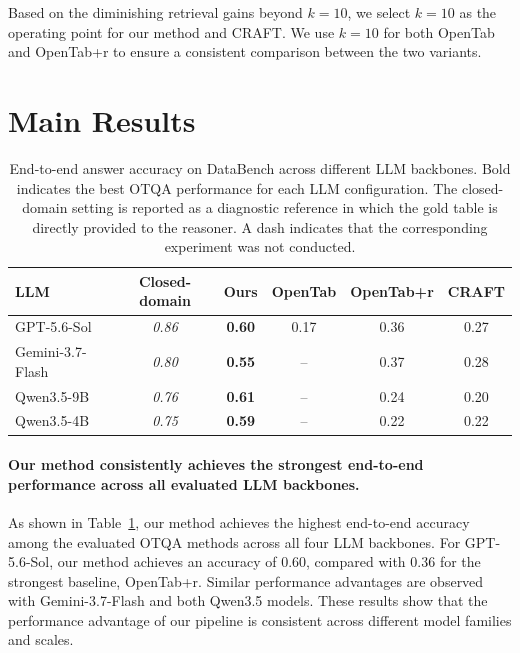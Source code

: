 Based on the diminishing retrieval gains beyond $k=10$, we select $k=10$ as the operating point for our method and CRAFT.
We use $k=10$ for both OpenTab and OpenTab+r to ensure a consistent comparison between the two variants.

\section{Main Results}
\begin{table}[t]
\centering
\caption{End-to-end answer accuracy on DataBench across different LLM backbones.
Bold indicates the best OTQA performance for each LLM configuration.
The closed-domain setting is reported as a diagnostic reference in which the gold table is directly provided to the reasoner.
A dash indicates that the corresponding experiment was not conducted.}
\label{tab:main_results}
\begin{tabular}{lccccc}
\toprule
\textbf{LLM} &
\textbf{Closed-domain} &
\textbf{Ours} &
\textbf{OpenTab} &
\textbf{OpenTab+r} &
\textbf{CRAFT} \\
\midrule
GPT-5.6-Sol
& \textit{0.86}
& \textbf{0.60}
& 0.17
& 0.36
& 0.27 \\

Gemini-3.7-Flash
& \textit{0.80}
& \textbf{0.55}
& --
& 0.37
& 0.28 \\

Qwen3.5-9B
& \textit{0.76}
& \textbf{0.61}
& --
& 0.24
& 0.20 \\

Qwen3.5-4B
& \textit{0.75}
& \textbf{0.59}
& --
& 0.22
& 0.22 \\
\bottomrule
\end{tabular}
\end{table}


\paragraph{Our method consistently achieves the strongest end-to-end performance across all evaluated LLM backbones.}
As shown in Table~\ref{tab:main_results}, our method achieves the highest end-to-end accuracy among the evaluated OTQA methods across all four LLM backbones.
For GPT-5.6-Sol, our method achieves an accuracy of $0.60$, compared with $0.36$ for the strongest baseline, OpenTab+r.
Similar performance advantages are observed with Gemini-3.7-Flash and both Qwen3.5 models.
These results show that the performance advantage of our pipeline is consistent across different model families and scales.


